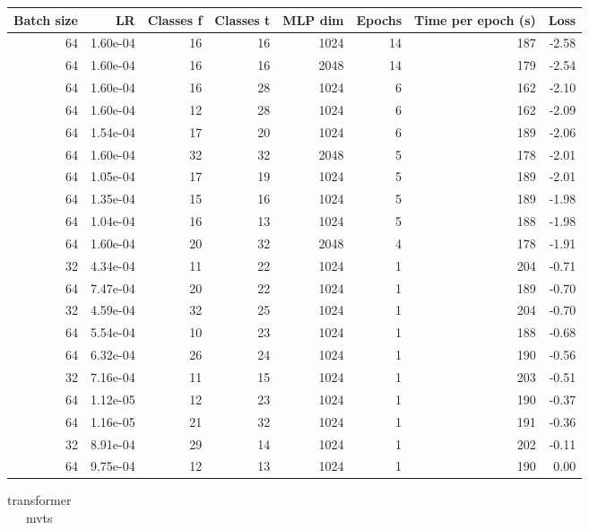\begin{appendices}
\begin{table}
\begin{tabular}{rrrrrrrr}
\multicolumn{1}{p{0.5cm}}{\raggedleft Batch size} & 
\multicolumn{1}{p{0.5cm}}{\raggedleft LR} & 
\multicolumn{1}{p{1.0cm}}{\raggedleft Classes f} & 
\multicolumn{1}{p{1.0cm}}{\raggedleft Classes t} & 
\multicolumn{1}{p{0.5cm}}{\raggedleft MLP dim} & 
\multicolumn{1}{p{1.0cm}}{\raggedleft Epochs} & 
\multicolumn{1}{p{1.5cm}}{\raggedleft Time per epoch (s)} & 
\multicolumn{1}{p{0.5cm}}{\raggedleft Loss} \\
\midrule
64 & 1.60e-04 & 16 & 16 & 1024 & 14 & 187 & -2.58 \\
64 & 1.60e-04 & 16 & 16 & 2048 & 14 & 179 & -2.54 \\
64 & 1.60e-04 & 16 & 28 & 1024 & 6 & 162 & -2.10 \\
64 & 1.60e-04 & 12 & 28 & 1024 & 6 & 162 & -2.09 \\
64 & 1.54e-04 & 17 & 20 & 1024 & 6 & 189 & -2.06 \\
64 & 1.60e-04 & 32 & 32 & 2048 & 5 & 178 & -2.01 \\
64 & 1.05e-04 & 17 & 19 & 1024 & 5 & 189 & -2.01 \\
64 & 1.35e-04 & 15 & 16 & 1024 & 5 & 189 & -1.98 \\
64 & 1.04e-04 & 16 & 13 & 1024 & 5 & 188 & -1.98 \\
64 & 1.60e-04 & 20 & 32 & 2048 & 4 & 178 & -1.91 \\
\midrule
32 & 4.34e-04 & 11 & 22 & 1024 & 1 & 204 & -0.71 \\
64 & 7.47e-04 & 20 & 22 & 1024 & 1 & 189 & -0.70 \\
32 & 4.59e-04 & 32 & 25 & 1024 & 1 & 204 & -0.70 \\
64 & 5.54e-04 & 10 & 23 & 1024 & 1 & 188 & -0.68 \\
64 & 6.32e-04 & 26 & 24 & 1024 & 1 & 190 & -0.56 \\
32 & 7.16e-04 & 11 & 15 & 1024 & 1 & 203 & -0.51 \\
64 & 1.12e-05 & 12 & 23 & 1024 & 1 & 190 & -0.37 \\
64 & 1.16e-05 & 21 & 32 & 1024 & 1 & 191 & -0.36 \\
32 & 8.91e-04 & 29 & 14 & 1024 & 1 & 202 & -0.11 \\
64 & 9.75e-04 & 12 & 13 & 1024 & 1 & 190 & 0.00 \\
\bottomrule
\end{tabular}
\end{table}

\begin{table}
\caption{transformer mvts}
\begin{tabular}{rrrrrrrrrrr}
\toprule


\end{tabular}
\end{table}
\end{appendices}
